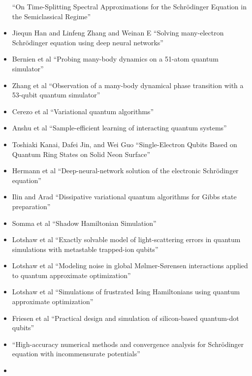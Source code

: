 \documentclass[]{article}
\begin{document}
\begin{itemize}
\cite{BAO2002487}
``On Time-Splitting Spectral Approximations for the Schrödinger Equation in the Semiclassical Regime''
\item
Jiequn Han and Linfeng Zhang and Weinan E\cite{HAN2019108929}
``Solving many-electron Schrödinger equation using deep neural networks''
\item
Bernien et al\cite{bernien2017probin}
``Probing many-body dynamics on a 51-atom quantum simulator''
\item
Zhang et al\cite{zhang2017observation}
``Observation of a many-body dynamical phase transition with a 53-qubit quantum simulator''
\item 
Cerezo et al\cite{cerezo2021variational}
``Variational quantum algorithms''
\item
Anshu et al\cite{anshu2021sample}
``Sample-efficient learning of interacting quantum systems''
\item
Toshiaki Kanai, Dafei Jin, and Wei Guo\cite{PhysRevLett.132.250603}
``Single-Electron Qubits Based on Quantum Ring States on Solid Neon Surface''
\item
Hermann et al\cite{hermann2020deep}
``Deep-neural-network solution of the electronic Schr{\"o}dinger equation''
\item
Ilin and Arad\cite{ilin2024dissipativevariationalquantumalgorithms}
``Dissipative variational quantum algorithms for Gibbs state preparation''
\item
Somma et al\cite{somma2024shadowhamiltoniansimulation}
``Shadow Hamiltonian Simulation''
\item 
Lotshaw et al\cite{PhysRevA.110.L030803}
``Exactly solvable model of light-scattering errors in quantum simulations with metastable trapped-ion qubits''
\item
Lotshaw et al\cite{PhysRevA.107.062406}
``Modeling noise in global M\o{}lmer-S\o{}rensen interactions applied to quantum approximate optimization''
\item
Lotshaw et al\cite{doi:10.1098/rsta.2021.0414}
``Simulations of frustrated Ising Hamiltonians using quantum approximate optimization''
\item Friesen et al\cite{PhysRevB.67.121301}
  ``Practical design and simulation of silicon-based quantum-dot qubits''
\item \cite{jiang2024high}
``High-accuracy numerical methods and convergence analysis for Schr{\"o}dinger equation with incommensurate potentials''
\item \cite{lin2019mathematical}

\end{itemize}
\end{document}
